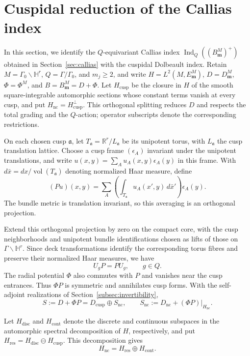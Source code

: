 \documentclass[11pt]{article}
\theoremstyle{definition}
\theoremstyle{plain}
\numberwithin{equation}{section}
\newcommand{\HH}{\mathbb H}
\newcommand{\cusp}{\mathrm{cusp}}
\newcommand{\nc}{\mathrm{nc}}
\newcommand{\res}{\mathrm{res}}
\newcommand{\cont}{\mathrm{cont}}
\newcommand{\Ind}{\operatorname{Ind}}
\begin{document}
\section{Cuspidal reduction of the Callias index} \label{sec:homotopy}

In this section, we identify the $Q$-equivariant Callias index
$\Ind_Q((B_{\boldsymbol m}^M)^+)$ obtained in Section~\ref{sec:callias}
with the cuspidal Dolbeault index.  Retain $M=\Gamma_0\backslash\HH^r$, $Q=\Gamma/\Gamma_0$, and $m_j\geq2$, and
write $H=L^2(M,E_{\boldsymbol m}^{M})$, $D=D_{\boldsymbol m}^M$, $\Phi=\Phi^M$, and
$B=B_{\boldsymbol m}^M=D+\Phi$. Let $H_{\cusp}$ be the closure in $H$ of the smooth square-integrable
automorphic sections whose constant terms vanish at every cusp, and put
$H_{\nc}=H_{\cusp}^{\perp}$. This orthogonal splitting reduces $D$
and respects the total grading and the $Q$-action; operator subscripts
denote the corresponding restrictions.

On each chosen cusp $\mathfrak a$, let
$T_{\mathfrak a}=\mathbb R^r/L_{\mathfrak a}$ be its unipotent torus,
with $L_{\mathfrak a}$ the cusp translation lattice.
Choose a cusp frame $(\epsilon_A)$ invariant under the unipotent
translations, and write
$u(x,y)=\sum_Au_A(x,y)\epsilon_A(y)$ in this frame.
With $d\bar x=dx/\operatorname{vol}(T_{\mathfrak a})$ denoting
normalized Haar measure, define
\begin{equation}\label{eq:P-average}
 (Pu)(x,y)
 =\sum_A\left(\int_{T_{\mathfrak a}}u_A(x',y)\,d\bar x'\right)
   \epsilon_A(y).
\end{equation}
The bundle metric is translation invariant, so this averaging is
an orthogonal projection.


Extend this orthogonal projection by zero on the compact core,
with the cusp neighborhoods and unipotent bundle identifications
chosen as lifts of those on $\Gamma\backslash\HH^r$.
Since deck transformations identify the corresponding torus fibres
and preserve their normalized Haar measures, we have
\[
 U_gP=PU_g,\qquad g\in Q.
\]
The radial potential $\Phi$ also commutes with $P$ and
vanishes near the cusp entrances. Thus $\Phi P$ is
symmetric and annihilates cusp forms. With the self-adjoint realizations of
Section~\ref{subsec:invertibility},
\begin{equation}\label{eq:comparison}  S:=D+\Phi P=D_{\cusp}\oplus S_{\nc},\qquad
S_{\nc}:=D_{\nc}+(\Phi P)|_{H_{\nc}}.
\end{equation}

Let $H_{\mathrm{disc}}$ and $H_{\cont}$ denote the discrete and
continuous subspaces in the automorphic spectral decomposition of $H$,
respectively, and put
$H_{\res}=H_{\mathrm{disc}}\ominus H_{\cusp}$.
This decomposition \cite[Prop.~2.10.5]{Labesse} gives
\begin{equation}\label{eq:spectral-splitting}  H_{\nc}=H_{\res}\oplus H_{\cont}.
\end{equation}
\end{document}
